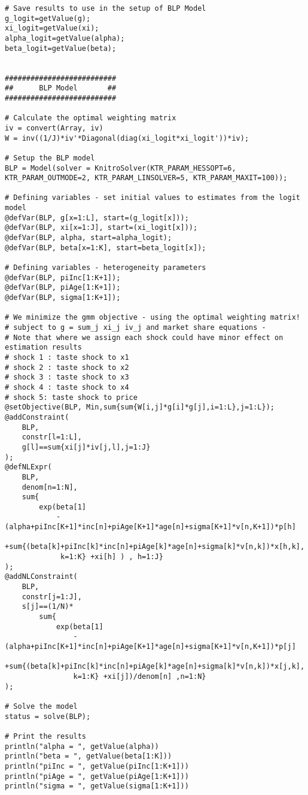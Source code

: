 \documentclass[a4paper,11pt]{article}
\begin{document}
{\begin{lstlisting}
# Save results to use in the setup of BLP Model
g_logit=getValue(g);
xi_logit=getValue(xi);
alpha_logit=getValue(alpha);
beta_logit=getValue(beta);


##########################
##      BLP Model       ##
##########################

# Calculate the optimal weighting matrix
iv = convert(Array, iv)
W = inv((1/J)*iv'*Diagonal(diag(xi_logit*xi_logit'))*iv);

# Setup the BLP model
BLP = Model(solver = KnitroSolver(KTR_PARAM_HESSOPT=6, 
KTR_PARAM_OUTMODE=2, KTR_PARAM_LINSOLVER=5, KTR_PARAM_MAXIT=100));

# Defining variables - set initial values to estimates from the logit model
@defVar(BLP, g[x=1:L], start=(g_logit[x]));
@defVar(BLP, xi[x=1:J], start=(xi_logit[x]));
@defVar(BLP, alpha, start=alpha_logit);
@defVar(BLP, beta[x=1:K], start=beta_logit[x]);

# Defining variables - heterogeneity parameters
@defVar(BLP, piInc[1:K+1]);
@defVar(BLP, piAge[1:K+1]);
@defVar(BLP, sigma[1:K+1]);

# We minimize the gmm objective - using the optimal weighting matrix! 
# subject to g = sum_j xi_j iv_j and market share equations - 
# Note that where we assign each shock could have minor effect on estimation results
# shock 1 : taste shock to x1
# shock 2 : taste shock to x2
# shock 3 : taste shock to x3
# shock 4 : taste shock to x4
# shock 5: taste shock to price
@setObjective(BLP, Min,sum{sum{W[i,j]*g[i]*g[j],i=1:L},j=1:L});
@addConstraint(
    BLP, 
    constr[l=1:L], 
    g[l]==sum{xi[j]*iv[j,l],j=1:J}
);
@defNLExpr(
    BLP,
    denom[n=1:N],
    sum{
        exp(beta[1]
            -(alpha+piInc[K+1]*inc[n]+piAge[K+1]*age[n]+sigma[K+1]*v[n,K+1])*p[h]
            +sum{(beta[k]+piInc[k]*inc[n]+piAge[k]*age[n]+sigma[k]*v[n,k])*x[h,k],
             k=1:K} +xi[h] ) , h=1:J}
);
@addNLConstraint(
    BLP,
    constr[j=1:J], 
    s[j]==(1/N)*
        sum{
            exp(beta[1]
                -(alpha+piInc[K+1]*inc[n]+piAge[K+1]*age[n]+sigma[K+1]*v[n,K+1])*p[j]
                 +sum{(beta[k]+piInc[k]*inc[n]+piAge[k]*age[n]+sigma[k]*v[n,k])*x[j,k],
                k=1:K} +xi[j])/denom[n] ,n=1:N}
);

# Solve the model
status = solve(BLP);

# Print the results
println("alpha = ", getValue(alpha))
println("beta = ", getValue(beta[1:K]))
println("piInc = ", getValue(piInc[1:K+1]))
println("piAge = ", getValue(piAge[1:K+1]))
println("sigma = ", getValue(sigma[1:K+1]))
\end{lstlisting}}
\end{document}
